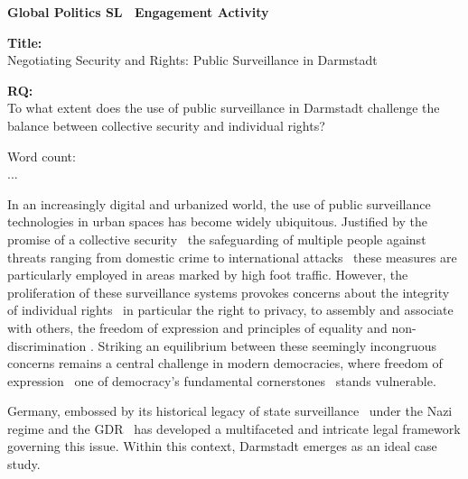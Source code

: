 \documentclass[12pt]{article}
\begin{document}
	
	\begin{titlepage}
		\centering
		
		\textbf{Global Politics SL \textemdash\ Engagement Activity}
		
		\vspace*{4cm}
		
		\textbf{Title:}\\
		Negotiating Security and Rights: Public Surveillance in Darmstadt
		
		\vspace{1cm}
		
		\textbf{RQ:}\\
		To what extent does the use of public surveillance in Darmstadt challenge the balance between collective security and individual rights?
		
		\vspace{4cm}
		
		Word count:\\
		...
		
		\vfill
	\end{titlepage}
	
	
	In an increasingly digital and urbanized world, the use of public surveillance technologies in urban spaces has become widely ubiquitous. Justified by the promise of a collective security \textemdash\ the safeguarding of multiple people against threats ranging from domestic crime to international attacks \parencites{noauthor_security_2025}{noauthor_collective_2025} \textemdash\ these measures are particularly employed in areas marked by high foot traffic. However, the proliferation of these surveillance systems provokes concerns about the integrity of individual rights \textemdash\ in particular the right to privacy, to assembly and associate with others, the freedom of expression and principles of equality and non-discrimination \parencite{nandy2023}. Striking an equilibrium between these seemingly incongruous concerns remains a central challenge in modern democracies, where freedom of expression \textemdash\ one of democracy's fundamental cornerstones \parencite{noauthor_special_nodate} \textemdash\ stands vulnerable. 
		
	Germany, embossed by its historical legacy of state surveillance \textemdash\ under the Nazi regime \parencite{mdrde_uberwachung_nodate} and the GDR \parencite{lichter_loeffler_siegloch2016} \textemdash\ has developed a multifaceted and intricate legal framework governing this issue. Within this context, Darmstadt emerges as an ideal case study.
	
\end{document}
